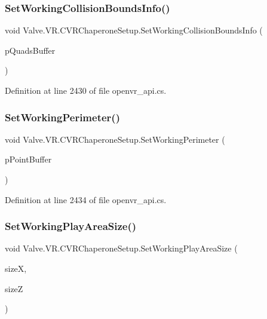 \subsubsection{\texorpdfstring{SetWorkingCollisionBoundsInfo()}{SetWorkingCollisionBoundsInfo()}}
{\footnotesize\ttfamily void Valve.\+V\+R.\+C\+V\+R\+Chaperone\+Setup.\+Set\+Working\+Collision\+Bounds\+Info (\begin{DoxyParamCaption}\item[{\mbox{\hyperlink{struct_valve_1_1_v_r_1_1_hmd_quad__t}{Hmd\+Quad\+\_\+t}} \mbox{[}$\,$\mbox{]}}]{p\+Quads\+Buffer }\end{DoxyParamCaption})}



Definition at line 2430 of file openvr\+\_\+api.\+cs.

\mbox{\label{class_valve_1_1_v_r_1_1_c_v_r_chaperone_setup_a27603428d4c757b8ecac4e26c13ea46c}} 
\subsubsection{\texorpdfstring{SetWorkingPerimeter()}{SetWorkingPerimeter()}}
{\footnotesize\ttfamily void Valve.\+V\+R.\+C\+V\+R\+Chaperone\+Setup.\+Set\+Working\+Perimeter (\begin{DoxyParamCaption}\item[{\mbox{\hyperlink{struct_valve_1_1_v_r_1_1_hmd_vector2__t}{Hmd\+Vector2\+\_\+t}} \mbox{[}$\,$\mbox{]}}]{p\+Point\+Buffer }\end{DoxyParamCaption})}



Definition at line 2434 of file openvr\+\_\+api.\+cs.

\mbox{\label{class_valve_1_1_v_r_1_1_c_v_r_chaperone_setup_a3b42da20dee26b61a7352d86c76e494d}} 
\subsubsection{\texorpdfstring{SetWorkingPlayAreaSize()}{SetWorkingPlayAreaSize()}}
{\footnotesize\ttfamily void Valve.\+V\+R.\+C\+V\+R\+Chaperone\+Setup.\+Set\+Working\+Play\+Area\+Size (\begin{DoxyParamCaption}\item[{float}]{sizeX,  }\item[{float}]{sizeZ }\end{DoxyParamCaption})}



